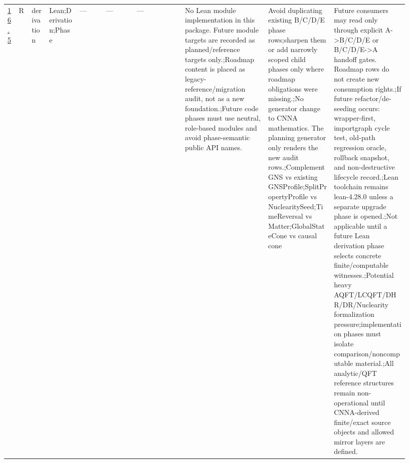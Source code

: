 \begin{longtable}{L{0.026\linewidth} L{0.024\linewidth} L{0.045\linewidth} L{0.07\linewidth} L{0.065\linewidth} L{0.075\linewidth} L{0.11\linewidth} L{0.19\linewidth} L{0.155\linewidth} L{0.17\linewidth}}
\hline
\addlinespace[0.24em]
\hyperlink{phase-row-16-5}{16.5} & R & derivation & Lean;\newline Derivation;\newline Phase & --- & --- & --- & No Lean module implementation in this package. Future module targets are recorded as planned/\allowbreak{}reference targets only.;\newline Roadmap content is placed as legacy-reference/\allowbreak{}migration audit, not as a new foundation.;\newline Future code phases must use neutral, role-based modules and avoid phase-semantic public API names. & Avoid duplicating existing B/\allowbreak{}C/\allowbreak{}D/\allowbreak{}E phase rows;\newline sharpen them or add narrowly scoped child phases only where roadmap obligations were missing.;\newline No generator change to CNNA mathematics. The planning generator only renders the new audit rows.;\newline ComplementGNS vs existing GNSProfile;\newline SplitPropertyProfile vs NuclearitySeed;\newline TimeReversal vs Matter;\newline GlobalStateCone vs causal cone & Future consumers may read only through explicit A->B/\allowbreak{}C/\allowbreak{}D/\allowbreak{}E or B/\allowbreak{}C/\allowbreak{}D/\allowbreak{}E->A handoff gates. Roadmap rows do not create new consumption rights.;\newline If future refactor/\allowbreak{}de-seeding occurs: wrapper-first, importgraph cycle test, old-path regression oracle, rollback snapshot, and non-destructive lifecycle record.;\newline Lean toolchain remains lean-4.28.0 unless a separate upgrade phase is opened.;\newline Not applicable until a future Lean derivation phase selects concrete finite/\allowbreak{}computable witnesses.;\newline Potential heavy AQFT/\allowbreak{}LCQFT/\allowbreak{}DHR/\allowbreak{}DR/\allowbreak{}Nuclearity formalization pressure;\newline implementation phases must isolate comparison/\allowbreak{}noncomputable material.;\newline All analytic/\allowbreak{}QFT reference structures remain non-operational until CNNA-derived finite/\allowbreak{}exact source objects and allowed mirror layers are defined.\\

\end{longtable}
